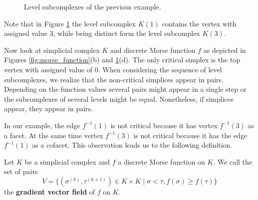 \begin{figure}[H]
\begin{subfigure}[b]{0.49\textwidth}
\begin{center}

\end{center}
\end{subfigure}
\begin{subfigure}[b]{0.49\textwidth}
\begin{center}

\end{center}
\end{subfigure}
\begin{subfigure}[b]{0.49\textwidth}
\begin{center}

\end{center}
\end{subfigure}
\begin{subfigure}[b]{0.49\textwidth}
\begin{center}

\end{center}
\end{subfigure}
\caption{Level subcomplexes of the previous example.}
\label{fig:level_sub_complex}
\end{figure}
Note that in Figure \ref{fig:level_sub_complex} the level subcomplex $K(1)$ contains the vertex with assigned value $3$, while being distinct form the level subcomplex $K(3)$.

Now look at simplicial complex $K$ and discrete Morse function $f$ as depicted in Figures \ref{fig:morse_function}(b) and \ref{fig:level_sub_complex}(d). The only critical simplex is the top vertex with assigned value of $0$. When considering the sequence of level subcomplexes, we realize that the non-critical simplices appear in pairs. Depending on the function values several pairs might appear in a single step or the subcomplexes of several levels might be equal. Nonetheless, if simplices appear, they appear in pairs.

In our example, the edge $f^{-1}(1)$ is not critical because it has vertex $f^{-1}(3)$ as a facet. At the same time vertex $f^{-1}(3)$ is not critical because it has the edge $f^{-1}(1)$ as a cofacet. This observation leads us to the following definition.

\begin{defi}
Let $K$ be a simplicial complex and $f$ a discrete Morse function on $K$.
We call the set of pairs \[
    V = \{(\sigma^{(k)}, \tau^{(k+1)}) \in K \times K  \mid  \sigma < \tau, f(\sigma) \geq f(\tau)\}
\]
the \textbf{gradient vector field} of $f$ on $K$. 
\end{defi}

